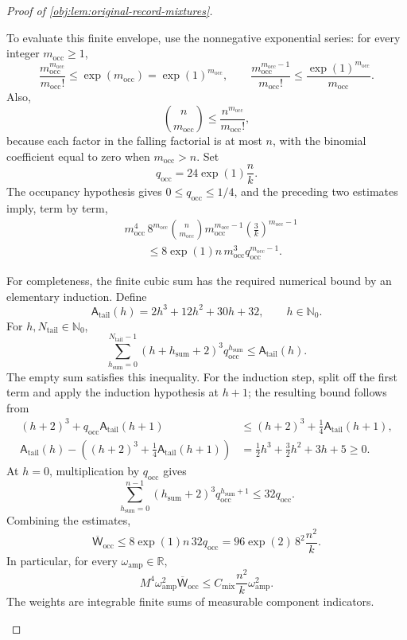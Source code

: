\documentclass[11pt]{article}
\begin{document}
\begin{proof}[Proof of \cref{obj:lem:original-record-mixtures}]
\begin{enumerate}
To evaluate this finite envelope, use the nonnegative exponential series:
for every integer \(m_{\mathrm{occ}}\ge1\),
\[
\frac{m_{\mathrm{occ}}^{m_{\mathrm{occ}}}}{m_{\mathrm{occ}}!}
\le \exp(m_{\mathrm{occ}})
=\exp(1)^{m_{\mathrm{occ}}},
\qquad
\frac{m_{\mathrm{occ}}^{m_{\mathrm{occ}}-1}}
{m_{\mathrm{occ}}!}
\le\frac{\exp(1)^{m_{\mathrm{occ}}}}{m_{\mathrm{occ}}}.
\]
Also,
\[
\binom n{m_{\mathrm{occ}}}
\le\frac{n^{m_{\mathrm{occ}}}}{m_{\mathrm{occ}}!},
\]
because each factor in the falling factorial is at most \(n\), with
the binomial coefficient equal to zero when \(m_{\mathrm{occ}}>n\).
Set
\[
q_{\mathrm{occ}}=24\exp(1)\frac nk.
\]
The occupancy hypothesis gives \(0\le q_{\mathrm{occ}}\le1/4\), and the
preceding two estimates imply, term by term,
\[
\begin{aligned}
&m_{\mathrm{occ}}^4\,8^{m_{\mathrm{occ}}}
\binom n{m_{\mathrm{occ}}}
m_{\mathrm{occ}}^{m_{\mathrm{occ}}-1}
\left(\frac3k\right)^{m_{\mathrm{occ}}-1}\\
&\hspace{2em}\le
8\exp(1)n\,m_{\mathrm{occ}}^3
q_{\mathrm{occ}}^{m_{\mathrm{occ}}-1}.
\end{aligned}
\]

For completeness, the finite cubic sum has the required numerical bound
by an elementary induction. Define
\[
\mathsf A_{\mathrm{tail}}(h)
=2h^3+12h^2+30h+32,
\qquad h\in\mathbb N_0.
\]
For \(h,N_{\mathrm{tail}}\in\mathbb N_0\),
\[
\sum_{h_{\mathrm{sum}}=0}^{N_{\mathrm{tail}}-1}
(h+h_{\mathrm{sum}}+2)^3q_{\mathrm{occ}}^{h_{\mathrm{sum}}}
\le \mathsf A_{\mathrm{tail}}(h).
\]
The empty sum satisfies this inequality. For the induction step, split
off the first term and apply the induction hypothesis at \(h+1\);
the resulting bound follows from
\[
\begin{aligned}
(h+2)^3+q_{\mathrm{occ}}\mathsf A_{\mathrm{tail}}(h+1)
&\le (h+2)^3+\frac14\mathsf A_{\mathrm{tail}}(h+1),\\
\mathsf A_{\mathrm{tail}}(h)
-\left((h+2)^3+\frac14\mathsf A_{\mathrm{tail}}(h+1)\right)
&=\frac12h^3+\frac32h^2+3h+5\ge0.
\end{aligned}
\]
At \(h=0\), multiplication by \(q_{\mathrm{occ}}\) gives
\[
\sum_{h_{\mathrm{sum}}=0}^{n-1}
(h_{\mathrm{sum}}+2)^3q_{\mathrm{occ}}^{h_{\mathrm{sum}}+1}
\le32q_{\mathrm{occ}}.
\]
Combining the estimates,
\[
\overline{\mathsf W}_{\mathrm{occ}}
\le8\exp(1)n\,32q_{\mathrm{occ}}
=96\exp(2)\,8^2\frac{n^2}{k}.
\]
In particular, for every \(\omega_{\mathrm{amp}}\in\mathbb R\),
\[
M^4\omega_{\mathrm{amp}}^2\overline{\mathsf W}_{\mathrm{occ}}
\le
C_{\mathrm{mix}}\frac{n^2}{k}\omega_{\mathrm{amp}}^2.
\]
The weights are integrable finite sums of measurable component
indicators.


\end{enumerate}
\end{proof}
\end{document}
